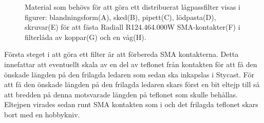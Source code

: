 \documentclass[main.tex]{subfiles}
\begin{document}
\begin{figure}[h]
    \caption{Material som behövs för att göra ett distribuerat lågpassfilter visas i figurer: blandningsform(A), sked(B), pipett(C), lödpasta(D), skruvar(E) för att fästa Radiall R124.464.000W SMA-kontakter(F) i filterlåda av koppar(G) och en våg(H).}
    \label{fig:filter_material}
\end{figure}





Första steget i att göra ett filter är att förbereda SMA kontakterna. Detta innefattar att eventuellt skala av en del av teflonet från kontakten för att få den önskade längden på den frilagda ledaren som sedan ska inkapslas i Stycast. För att få den önskade längden på den frilagda ledaren skars först en bit eltejp till så att bredden på denna motsvarade längden på teflonet som skulle behållas. Eltejpen virades sedan runt SMA kontakten som i  och det frilagda teflonet skars bort med en hobbykniv. 

\end{document}
